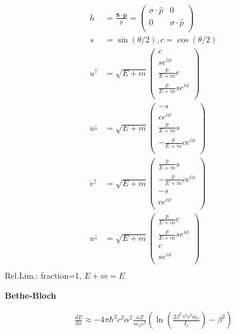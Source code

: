 \documentclass[10pt,letterpaper]{article}
\newcommand{\0}{\mathcal{O}}
\begin{document}
\begin{multicols}{3}
\begin{align*}
    h &= \frac{\mathbf{S} \cdot \mathbf{p}}{p} = \begin{pmatrix}
        \sigma \cdot \hat{p} & 0 \\
        0 & \sigma \cdot \hat{p} \\
    \end{pmatrix}\\
    s &= \sin(\theta/2), c=\cos(\theta/2)\\
    u^\uparrow &= \sqrt{E+m} \begin{pmatrix}
        c \\
        se^{i\phi} \\
        \frac{p}{E+m}c \\
        \frac{p}{E+m}se^{i\phi} \\
    \end{pmatrix}\\
    u^\downarrow &= \sqrt{E+m} \begin{pmatrix}
        -s \\
        ce^{i\phi} \\
        \frac{p}{E+m}s \\
        -\frac{p}{E+m}ce^{i\phi} \\
    \end{pmatrix}\\
    v^\uparrow &= \sqrt{E+m} \begin{pmatrix}
        \frac{p}{E+m}s \\
        -\frac{p}{E+m}ce^{i\phi} \\
        -s \\
        ce^{i\phi} \\
    \end{pmatrix}\\
    u^\downarrow &= \sqrt{E+m} \begin{pmatrix}
        \frac{p}{E+m}c \\
        \frac{p}{E+m}se^{i\phi} \\
        c \\
        se^{i\phi} \\
    \end{pmatrix}\\
\end{align*}
Rel.Lim.: fraction=1, $E+m=E$

\newpage
\textbf{Bethe-Bloch}

\begin{align*}
    \frac{dE}{dx} \approx -4\pi\hbar^2 c^2 \alpha^2 \frac{nZ}{m_2v^2}\left(\ln\left(\frac{2\beta^2\gamma^2c^2m_e}{I_e}\right) - \beta^2\right)
\end{align*}


\end{multicols}
\end{document}
